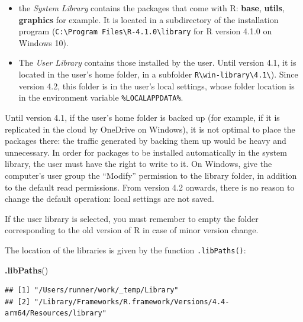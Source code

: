 \documentclass[
  12pt,
  american,
  a4paper,
  extrafontsizes,onecolumn,openright
  ]{memoir}
\newenvironment{Shaded}{\begin{snugshade}}{\end{snugshade}}
\newcommand{\FunctionTok}[1]{\textcolor[rgb]{0.13,0.29,0.53}{\textbf{#1}}}
\newcommand{\NormalTok}[1]{#1}
\providecommand{\tightlist}{%
  \setlength{\itemsep}{0pt}\setlength{\parskip}{0pt}}
\begin{document}
\begin{itemize}
\tightlist
\item
  the \emph{System Library} contains the packages that come with R: \textbf{base}, \textbf{utils}, \textbf{graphics} for example.
  It is located in a subdirectory of the installation program (\texttt{C:\textbackslash{}Program\ Files\textbackslash{}R-4.1.0\textbackslash{}library} for R version 4.1.0 on Windows 10).
\item
  The \emph{User Library} contains those installed by the user.
  Until version 4.1, it is located in the user's home folder, in a subfolder \texttt{R\textbackslash{}win-library\textbackslash{}4.1\textbackslash{}}).
  Since version 4.2, this folder is in the user's local settings, whose folder location is in the environment variable \texttt{\%LOCALAPPDATA\%}.
\end{itemize}

Until version 4.1, if the user's home folder is backed up (for example, if it is replicated in the cloud by OneDrive on Windows), it is not optimal to place the packages there: the traffic generated by backing them up would be heavy and unnecessary.
In order for packages to be installed automatically in the system library, the user must have the right to write to it.
On Windows, give the computer's user group the \enquote{Modify} permission to the library folder, in addition to the default read permissions.
From version 4.2 onwards, there is no reason to change the default operation: local settings are not saved.

If the user library is selected, you must remember to empty the folder corresponding to the old version of R in case of minor version change.

The location of the libraries is given by the function \texttt{.libPaths()}:

\scriptsize

\begin{Shaded}
\begin{Highlighting}[]
\FunctionTok{.libPaths}\NormalTok{()}
\end{Highlighting}
\end{Shaded}

\begin{verbatim}
## [1] "/Users/runner/work/_temp/Library"                                    
## [2] "/Library/Frameworks/R.framework/Versions/4.4-arm64/Resources/library"
\end{verbatim}

\normalsize
\end{document}
